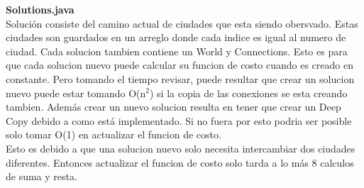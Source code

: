 \documentclass{article}
\begin{document}
    
    
    \textbf{Solutions.java} \\
    Solución consiste del camino actual de ciudades que esta siendo obersvado. Estas ciudades son guardados en
    un arreglo donde cada indice es igual al numero de ciudad. Cada solucion tambien contiene un World y
    Connections. Esto es para que cada solucion nuevo puede calcular su funcion de costo cuando es creado en
    constante. Pero tomando el tiempo revisar, puede resultar que crear un solucion nuevo puede estar tomando
    O(n$^2$) si la copia de las conexiones se esta creando tambien. Además crear un nuevo solucion
    resulta en tener que crear un Deep Copy debido a como está implementado. Si no fuera por esto podria
    ser posible solo tomar O(1) en actualizar el funcion de costo. \\
    
    Esto es debido a que una solucion nuevo solo necesita intercambiar dos ciudades diferentes. Entonces
    actualizar el funcion de costo solo tarda a lo más 8 calculos de suma y resta.\\
    
    
\end{document}

